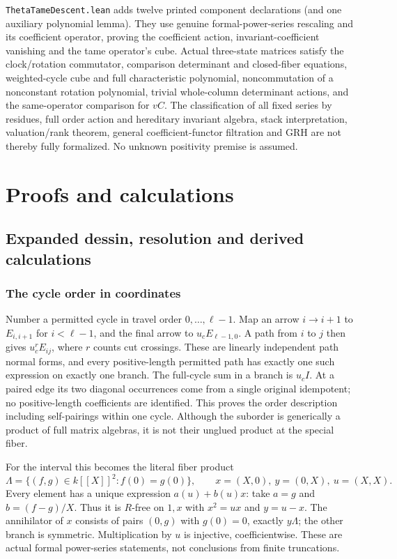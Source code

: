 \texttt{ThetaTameDescent.lean} adds twelve printed component declarations (and one auxiliary polynomial lemma). They use genuine formal-power-series rescaling and its coefficient operator, proving the coefficient action, invariant-coefficient vanishing and the tame operator's cube. Actual three-state matrices satisfy the clock/rotation commutator, comparison determinant and closed-fiber equations, weighted-cycle cube and full characteristic polynomial, noncommutation of a nonconstant rotation polynomial, trivial whole-column determinant actions, and the same-operator comparison for $vC$. The classification of all fixed series by residues, full order action and hereditary invariant algebra, stack interpretation, valuation/rank theorem, general coefficient-functor filtration and GRH are not thereby fully formalized. No unknown positivity premise is assumed.

\part{Proofs and calculations}

\chapter{Expanded dessin, resolution and derived calculations}
\section{The cycle order in coordinates}
Number a permitted cycle in travel order $0,\ldots,\ell-1$. Map an arrow $i\to i+1$ to $E_{i,i+1}$ for $i<\ell-1$, and the final arrow to $u_c E_{\ell-1,0}$. A path from $i$ to $j$ then gives $u_c^rE_{ij}$, where $r$ counts cut crossings. These are linearly independent path normal forms, and every positive-length permitted path has exactly one such expression on exactly one branch. The full-cycle sum in a branch is $u_c I$. At a paired edge its two diagonal occurrences come from a single original idempotent; no positive-length coefficients are identified. This proves the order description including self-pairings within one cycle. Although the suborder is generically a product of full matrix algebras, it is not their unglued product at the special fiber.

For the interval this becomes the literal fiber product
\[
 \Lambda=\{(f,g)\in k[[X]]^2:f(0)=g(0)\},\qquad
 x=(X,0),\ y=(0,X),\ u=(X,X).
\]
Every element has a unique expression $a(u)+b(u)x$: take $a=g$ and $b=(f-g)/X$. Thus it is $R$-free on $1,x$ with $x^2=ux$ and $y=u-x$. The annihilator of $x$ consists of pairs $(0,g)$ with $g(0)=0$, exactly $y\Lambda$; the other branch is symmetric. Multiplication by $u$ is injective, coefficientwise. These are actual formal power-series statements, not conclusions from finite truncations.

